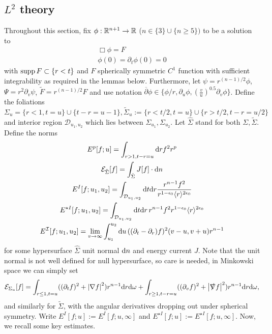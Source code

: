 \documentclass[11pt, oneside]{amsart}
\begin{document}
	\subsection{$L^2$ theory}\label{L2 technical estimates}
	Throughout this section, fix $\phi:\mathbb{R}^{n+1}\to\mathbb{R}$ ($n\in\{3\}\cup\{n\geq5\})$ to be a solution to
	\begin{equation}\label{linear}
		\begin{gathered}
			\Box\phi=F\\
			\phi(0)=\partial_t\phi(0)=0
		\end{gathered}
	\end{equation}
with $\operatorname{supp} F\subset\{r<t\}$ and $F$ spherically symmetric $C^1$ function with sufficient integrability as required in the lemmas below. Furthermore, let $\psi=r^{(n-1)/2}\phi$, $\Psi=r^2\partial_v\psi$, $\tilde{F}=r^{(n-1)/2}F$ and use notation $\overline{\partial}\phi\in\{\phi/r,\partial_u\phi,(\frac{v}{u})^{0.5}\partial_v\phi\}$. Define the foliations $\Sigma_u=\{r<1,t=u\}\cup\{t-r=u-1\},\tilde{\Sigma}_u:=\{r<t/2,t=u\}\cup\{r>t/2,t-r=u/2\}$ and interior region $\mathcal{D}_{u_1,u_2}$ which lies between $\Sigma_{u_1},\Sigma_{u_2}$. Let $\hat{\Sigma}$ stand for both $\Sigma,\tilde{\Sigma}$. Define the norms
\begin{equation}\label{definitino of E norms}
	\begin{gathered}
		E^p[f;u]=\int_{r>1,t-r=u}\mathrm{d} r f^2 r^p\\
		\mathcal{E}_{\hat{\Sigma}}[f]=\int_{\hat{\Sigma}}J[f]\cdot\mathrm{d} n\\
		E^{I}[f;u_1,u_2]=\int_{\mathcal{D}_{u_1,u_2}} \mathrm{d} t \mathrm{d} r \frac{r^{n-1}f^2}{r^{1-\epsilon_0}\langle r \rangle^{2\epsilon_0}}\\
		E^{\star I}[f;u_1,u_2]=\int_{\mathcal{D}_{u_1,u_2}} \mathrm{d} t \mathrm{d} r\, r^{n-1}f^2r^{1-\epsilon_0}\langle r \rangle^{2\epsilon_0}\\
		E^{\mathcal{I}}[f;u_1,u_2]=\lim_{v\to\infty}\int_{u_1}^{u_2}\mathrm{d} u\,((\partial_t-\partial_r) f)^2(v-u,v+u)r^{n-1}
	\end{gathered}
\end{equation}
for some hypersurface $\hat{\Sigma}$ unit normal $\mathrm{d} n$ and energy current $J$. Note that the unit normal is not well defined for null hypersurface, so care is needed, in Minkowski space we can simply set 
\begin{equation*}
	\begin{gathered}
		\mathcal{E}_{\Sigma_u}[f]=\int_{r\leq1,t=u}((\partial_tf)^2+\left\lvert \nabla f\right\rvert^2)r^{n-1}\mathrm{d} r\mathrm{d}\omega+\int_{r\geq1,t-r=u}((\partial_v f)^2+\left\lvert \slashed{\nabla}f\right\rvert^2)r^{n-1}\mathrm{d} r \mathrm{d}\omega,
	\end{gathered}
\end{equation*}
and similarly for $\tilde{\Sigma}$, with the angular derivatives dropping out under spherical symmetry. Write $E^{I}[f;u]:=E^{I}[f;u,\infty]$ and $E^{\star I}[f;u]:=E^{\star I}[f;u,\infty]$. Now, we recall some key estimates.
\end{document}
